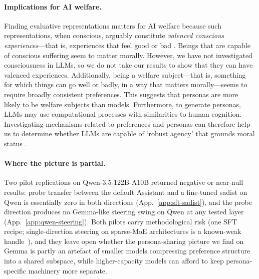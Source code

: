 \documentclass{article}
\begin{document}
\paragraph{Implications for AI welfare.}
Finding evaluative representations matters for AI welfare because such representations, when conscious, arguably constitute \textit{valenced conscious experiences}---that is, experiences that feel good or bad \citep{carruthers2018valence}. Beings that are capable of conscious suffering seem to matter morally. However, we have not investigated consciousness in LLMs, so we do not take our results to show that they can have valenced experiences. Additionally, being a welfare subject---that is, something for which things can go well or badly, in a way that matters morally---seems to require broadly consistent preferences. This suggests that personas are more likely to be welfare subjects than models. Furthermore, to generate personas, LLMs may use computational processes with similarities to human cognition. Investigating mechanisms related to preferences and personas can therefore help us to determine whether LLMs are capable of `robust agency' that grounds moral status \citep{long2024moralpatiency}.

\paragraph{Where the picture is partial.}
Two pilot replications on Qwen-3.5-122B-A10B returned negative or near-null results: probe transfer between the default Assistant and a fine-tuned sadist on Qwen is essentially zero in both directions (App.~\ref{app:sft-sadist}), and the probe direction produces no Gemma-like steering swing on Qwen at any tested layer (App.~\ref{app:qwen-steering}). Both pilots carry methodological risk (one SFT recipe; single-direction steering on sparse-MoE architectures is a known-weak handle~\citep{fayyaz2025steermoe}), and they leave open whether the persona-sharing picture we find on Gemma is partly an artefact of smaller models compressing preference structure into a shared subspace, while higher-capacity models can afford to keep persona-specific machinery more separate.
\end{document}
